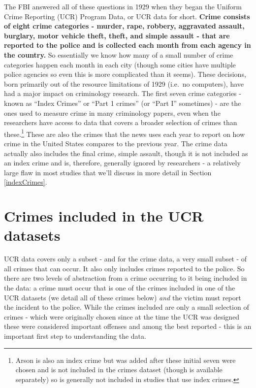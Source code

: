 \documentclass[
  12pt,
  openany]{book}
\begin{document}
The FBI answered all of these questions in 1929 when they began the Uniform Crime Reporting (UCR) Program Data, or UCR data for short. \textbf{Crime consists of eight crime categories - murder, rape, robbery, aggravated assault, burglary, motor vehicle theft, theft, and simple assault - that are reported to the police and is collected each month from each agency in the country.} So essentially we know how many of a small number of crime categories happen each month in each city (though some cities have multiple police agencies so even this is more complicated than it seems). These decisions, born primarily out of the resource limitations of 1929 (i.e.~no computers), have had a major impact on criminology research. The first seven crime categories - known as ``Index Crimes'' or ``Part 1 crimes'' (or ``Part I'' sometimes) - are the ones used to measure crime in many criminology papers, even when the researchers have access to data that covers a broader selection of crimes than these.\footnote{Arson is also an index crime but was added after these initial seven were chosen and is not included in the crimes dataset (though is available separately) so is generally not included in studies that use index crimes.} These are also the crimes that the news uses each year to report on how crime in the United States compares to the previous year. The crime data actually also includes the final crime, simple assault, though it is not included as an index crime and is, therefore, generally ignored by researchers - a relatively large flaw in most studies that we'll discuss in more detail in Section \ref{indexCrimes}.

\hypertarget{crimes-included-in-the-ucr-datasets}{%
\section{Crimes included in the UCR datasets}\label{crimes-included-in-the-ucr-datasets}}

UCR data covers only a subset - and for the crime data, a very small subset - of all crimes that can occur. It also only includes crimes reported to the police. So there are two levels of abstraction from a crime occurring to it being included in the data: a crime must occur that is one of the crimes included in one of the UCR datasets (we detail all of these crimes below) \emph{and} the victim must report the incident to the police. While the crimes included are only a small selection of crimes - which were originally chosen since at the time the UCR was designed these were considered important offenses and among the best reported - this is an important first step to understanding the data.
\end{document}
